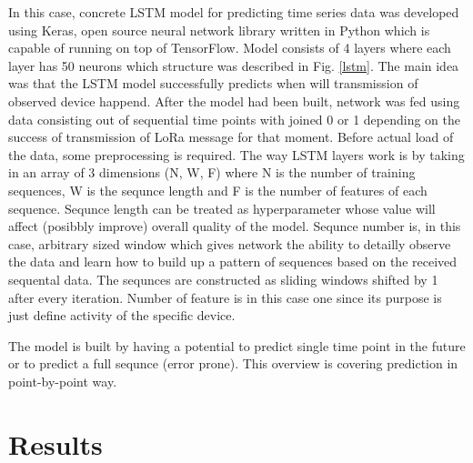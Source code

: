 \documentclass[11pt, a4paper]{article} %
\begin{document}
In this case, concrete LSTM model for predicting time series data was developed using Keras, open source neural network library written in Python which is capable of running on top of TensorFlow. Model consists of 4 layers where each layer has 50 neurons which structure was described in Fig. \ref{lstm}. 
The main idea was that the LSTM model successfully predicts when will transmission of observed device happend. 
After the model had been built, network was fed using data consisting out of sequential time points with joined 0 or 1 depending on the success of transmission of LoRa message for that moment.
Before actual load of the data, some preprocessing is required.
The way LSTM layers work is by taking in an array of 3 dimensions (N, W, F) where N is the number of training sequences, W is the sequnce length and F is the number of features of each sequence. 
Sequnce length can be treated as hyperparameter whose value will affect (posibbly improve) overall quality of the model. Sequnce number is, in this case, arbitrary sized window which gives network the ability to detailly observe the data and learn how to build up a pattern of sequences based on the received sequental data.  
The sequnces are constructed as sliding windows shifted by 1 after every iteration. 
Number of feature is in this case one since its purpose is just define activity of the specific device. 

The model is built by having a potential to predict single time point in the future or to predict a full sequnce (error prone). This overview is covering prediction in point-by-point way.

\section{Results}
\end{document}
